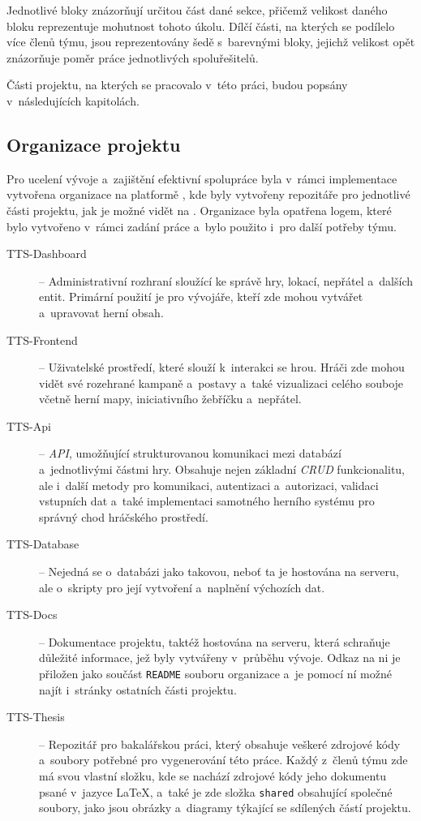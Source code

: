 Jednotlivé bloky znázorňují určitou část dané sekce, přičemž velikost daného bloku reprezentuje mohutnost tohoto úkolu. Dílčí části, na kterých se podílelo více členů týmu, jsou reprezentovány šedě s~barevnými bloky, jejichž velikost opět znázorňuje poměr práce jednotlivých spoluřešitelů.

Části projektu, na kterých se pracovalo v~této práci, budou popsány v~následujících kapitolách.

\subsection{Organizace projektu}
\label{subsec:versioning}

Pro ucelení vývoje a~zajištění efektivní spolupráce byla v~rámci implementace vytvořena organizace  na platformě , kde byly vytvořeny repozitáře pro jednotlivé části projektu, jak je možné vidět na . Organizace byla opatřena logem, které bylo vytvořeno v~rámci zadání práce a~bylo použito i~pro další potřeby týmu.

\begin{description}
    \item [TTS-Dashboard] -- Administrativní rozhraní sloužící ke správě hry, lokací, nepřátel a~dalších entit. Primární použití je pro vývojáře, kteří zde mohou vytvářet a~upravovat herní obsah.
    \item [TTS-Frontend] -- Uživatelské prostředí, které slouží k~interakci se hrou. Hráči zde mohou vidět své rozehrané kampaně a~postavy a~také vizualizaci celého souboje včetně herní mapy, iniciativního žebříčku a~nepřátel.
    \item [TTS-Api] -- \textit{API}, umožňující strukturovanou komunikaci mezi databází a~jednotlivými částmi hry. Obsahuje nejen základní \textit{CRUD} funkcionalitu, ale i~další metody pro komunikaci, autentizaci a~autorizaci, validaci vstupních dat a~také implementaci samotného herního systému pro správný chod hráčského prostředí.
    \item [TTS-Database] -- Nejedná se o~databázi jako takovou, neboť ta je hostována na serveru, ale o~skripty pro její vytvoření a~naplnění výchozích dat.
    \item [TTS-Docs] -- Dokumentace projektu, taktéž hostována na serveru, která schraňuje důležité informace, jež byly vytvářeny v~průběhu vývoje. Odkaz na ni je přiložen jako součást \texttt{README} souboru organizace a~je pomocí ní možné najít i~stránky ostatních části projektu.
    \item [TTS-Thesis] -- Repozitář pro bakalářskou práci, který obsahuje veškeré zdrojové kódy a~soubory potřebné pro vygenerování této práce. Každý z~členů týmu zde má svou vlastní složku, kde se nachází zdrojové kódy jeho dokumentu psané v~jazyce \LaTeX, a~také je zde složka \texttt{shared} obsahující společné soubory, jako jsou obrázky a~diagramy týkající se sdílených částí projektu.
\end{description}

